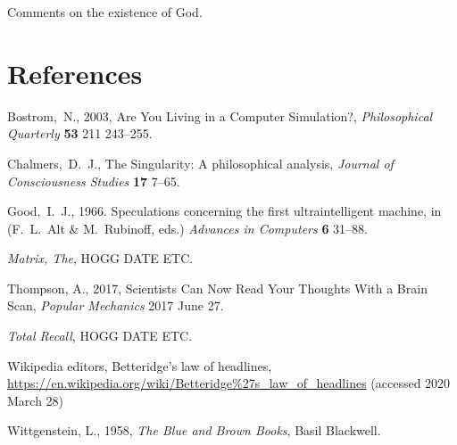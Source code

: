 Comments on the existence of God.

\section*{References}
\begin{trivlist}
\item Bostrom,~N., 2003, Are You Living in a Computer Simulation?,
  \textit{Philosophical Quarterly} \textbf{53} 211 243--255.
\item Chalmers,~D.~J., The Singularity: A philosophical analysis,
  \textit{Journal of Consciousness Studies} \textbf{17} 7--65.
\item Good,~I.~J., 1966. Speculations concerning the first ultraintelligent machine,
  in (F.~L.~Alt \& M.~Rubinoff, eds.) \textit{Advances in Computers} \textbf{6} 31--88.
\item \textit{Matrix, The}, HOGG DATE ETC.
\item Thompson, A., 2017, Scientists Can Now Read Your Thoughts With a Brain Scan,
  \textit{Popular Mechanics} 2017 June 27.
\item \textit{Total Recall}, HOGG DATE ETC.
\item Wikipedia editors, Betteridge's law of headlines,
  \url{https://en.wikipedia.org/wiki/Betteridge%27s_law_of_headlines}
    (accessed 2020 March 28)
\item Wittgenstein, L., 1958, \textit{The Blue and Brown Books},
  Basil Blackwell.
\end{trivlist}
